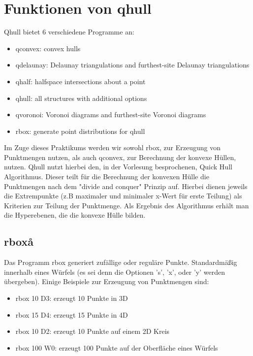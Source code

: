 \documentclass[12pt]{scrartcl}
\begin{document}
\section{Funktionen von qhull}

Qhull bietet 6 verschiedene Programme an:
\begin{itemize}
    \setlength\itemsep{0em}
    \item qconvex: convex hulls
    \item qdelaunay: Delaunay triangulations and furthest-site Delaunay triangulations
    \item qhalf: halfspace intersections about a point
    \item qhull: all structures with additional options
    \item qvoronoi: Voronoi diagrams and furthest-site Voronoi diagrams
    \item rbox: generate point distributions for qhull
\end{itemize}

Im Zuge dieses Praktikums werden wir sowohl rbox, zur Erzeugung von Punktmengen nutzen, als auch qconvex, zur Berechnung der konvexe Hüllen, nutzen.
Qhull nutzt hierbei den, in der Vorlesung besprochenen, Quick Hull Algorithmus. Dieser teilt für die Berechnung der konvexen Hülle die Punktmengen nach dem "divide and conquer" Prinzip auf. Hierbei dienen jeweils die Extrempunkte (z.B maximaler und minimaler x-Wert für erste Teilung) als Kriterien zur Teilung der Punktmenge. Als Ergebnis des Algorithmus erhält man die Hyperebenen, die die konvexe Hülle bilden.



\subsection{rboxå}
Das Programm rbox generiert zufällige oder reguläre Punkte. Standardmäßig innerhalb eines Würfels (es sei denn die Optionen 's', 'x', oder 'y' werden übergeben).
Einige Beispiele zur Erzeugung von Punktmengen sind:
\begin{itemize}
    \setlength\itemsep{0em}
    \item rbox 10 D3: erzeugt 10 Punkte in 3D
    \item rbox 15 D4: erzeugt 15 Punkte in 4D
    \item rbox 10 D2: erzeugt 10 Punkte auf einem 2D Kreis
    \item rbox 100 W0: erzeugt 100 Punkte  auf der Oberfläche eines Würfels
\end{itemize}
\end{document}
